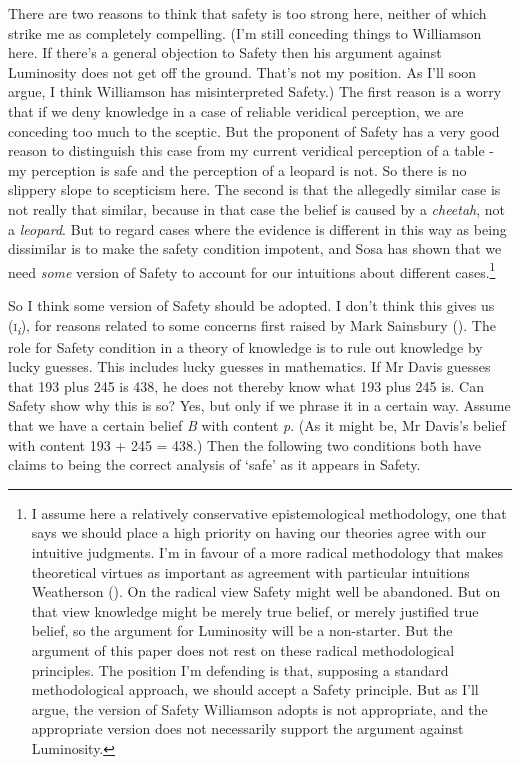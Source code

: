 \documentclass[
  11pt,
  letterpaper,
  DIV=11,
  numbers=noendperiod,
  twoside]{scrartcl}
\begin{document}
There are two reasons to think that safety is too strong here, neither
of which strike me as completely compelling. (I'm still conceding things
to Williamson here. If there's a general objection to Safety then his
argument against Luminosity does not get off the ground. That's not my
position. As I'll soon argue, I think Williamson has misinterpreted
Safety.) The first reason is a worry that if we deny knowledge in a case
of reliable veridical perception, we are conceding too much to the
sceptic. But the proponent of Safety has a very good reason to
distinguish this case from my current veridical perception of a table -
my perception is safe and the perception of a leopard is not. So there
is no slippery slope to scepticism here. The second is that the
allegedly similar case is not really that similar, because in that case
the belief is caused by a \emph{cheetah}, not a \emph{leopard}. But to
regard cases where the evidence is different in this way as being
dissimilar is to make the safety condition impotent, and Sosa has shown
that we need \emph{some} version of Safety to account for our intuitions
about different cases.\footnote{I assume here a relatively conservative
  epistemological methodology, one that says we should place a high
  priority on having our theories agree with our intuitive judgments.
  I'm in favour of a more radical methodology that makes theoretical
  virtues as important as agreement with particular intuitions
  Weatherson (). On the
  radical view Safety might well be abandoned. But on that view
  knowledge might be merely true belief, or merely justified true
  belief, so the argument for Luminosity will be a non-starter. But the
  argument of this paper does not rest on these radical methodological
  principles. The position I'm defending is that, supposing a standard
  methodological approach, we should accept a Safety principle. But as
  I'll argue, the version of Safety Williamson adopts is not
  appropriate, and the appropriate version does not necessarily support
  the argument against Luminosity.}

So I think some version of Safety should be adopted. I don't think this
gives us (\textsc{i}\textsubscript{\emph{i}}), for reasons related to
some concerns first raised by Mark Sainsbury
(). The role for Safety condition in a
theory of knowledge is to rule out knowledge by lucky guesses. This
includes lucky guesses in mathematics. If Mr Davis guesses that 193 plus
245 is 438, he does not thereby know what 193 plus 245 is. Can Safety
show why this is so? Yes, but only if we phrase it in a certain way.
Assume that we have a certain belief \emph{B} with content \emph{p}. (As
it might be, Mr Davis's belief with content 193 + 245 = 438.) Then the
following two conditions both have claims to being the correct analysis
of `safe' as it appears in Safety.
\end{document}
